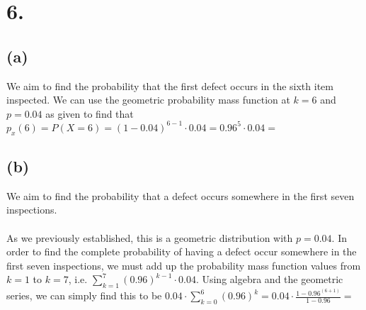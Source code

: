 \documentclass{article}
\begin{document}
\section*{6.}
{\Large 

\subsection*{(a)}
We aim to find the probability that the first defect occurs in the sixth item inspected. We can use the geometric probability mass function at $k = 6$ and $p = 0.04$ as given to find that $p_x(6) = P(X = 6) = (1 - 0.04)^{6-1} \cdot 0.04 = 0.96^5 \cdot 0.04 = $ 

\subsection*{(b)}
We aim to find the probability that a defect occurs somewhere in the first seven inspections. \\ \\
As we previously established, this is a geometric distribution with $p = 0.04$. In order to find the complete probability of having a defect occur somewhere in the first seven inspections, we must add up the probability mass function values from $k = 1$ to $k = 7$, i.e. $\sum_{k = 1}^{7} (0.96)^{k-1} \cdot 0.04$. Using algebra and the  geometric series, we can simply find this to be $0.04 \cdot \sum_{k = 0}^{6} (0.96)^k = 0.04 \cdot \frac{1-0.96^(6+1)}{1-0.96} = $ 

}
\end{document}
